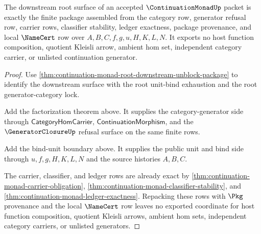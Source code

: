 \begin{theorem}
\label{thm:continuation-monad-root-downstream-surface-exactness}
The downstream root surface of an accepted $\ContinuationMonadUp$ packet is
exactly the finite package assembled from the category row, generator refusal
row, carrier rows, classifier stability, ledger exactness, package
provenance, and local $\NameCert$ row over $A,B,C,f,g,u,H,K,L,N$. It exports
no host function composition, quotient Kleisli arrow, ambient hom set,
independent category carrier, or unlisted continuation generator.
\end{theorem}
\begin{proof}
Use \autoref{thm:continuation-monad-root-downstream-unblock-package} to
identify the downstream surface with the root unit-bind exhaustion and the
root generator-category lock.

Add the factorization theorem above. It supplies the category-generator side
through $\mathsf{CategoryHomCarrier}$, $\mathsf{ContinuationMorphism}$, and
the $\GeneratorClosureUp$ refusal surface on the same finite rows.

Add the bind-unit boundary above. It supplies the public unit and bind side
through $u,f,g,H,K,L,N$ and the source histories $A,B,C$.

The carrier, classifier, and ledger rows are already exact by
\autoref{thm:continuation-monad-carrier-obligation},
\autoref{thm:continuation-monad-classifier-stability}, and
\autoref{thm:continuation-monad-ledger-exactness}. Repacking these rows with
$\Pkg$ provenance and the local $\NameCert$ row leaves no exported coordinate
for host function composition, quotient Kleisli arrows, ambient hom sets,
independent category carriers, or unlisted generators.
\end{proof}

